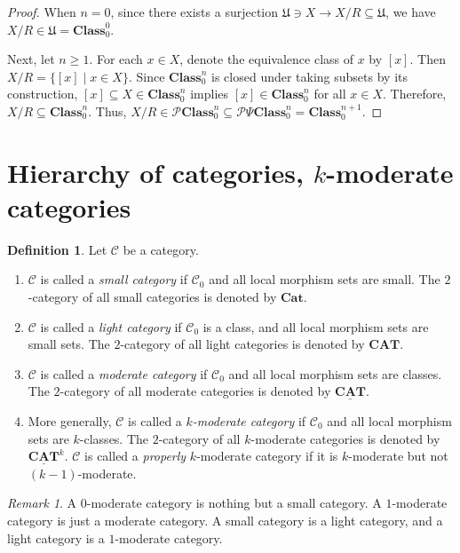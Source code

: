 \documentclass{surv-l}
\numberwithin{equation}{chapter}
\numberwithin{figure}{chapter}
\theoremstyle{plain}
\theoremstyle{definition}
\newtheorem{dfn}[thm]{Definition}
\theoremstyle{remark}
\newtheorem{rmk}[thm]{Remark}
\begin{document}
\begin{proof}
When $n = 0$, since there exists a surjection $\mathfrak{U} \ni X \to X/R \subseteq \mathfrak{U}$,
we have $X/R \in \mathfrak{U} = \mathbf{Class}_0^0$.

Next, let $n \ge 1$.
For each $x \in X$, denote the equivalence class of $x$ by $[x]$.
Then $X/R = \{[x] \mid x \in X\}$.
Since $\mathbf{Class}_0^n$ is closed under taking subsets by its construction,
$[x] \subseteq X \in \mathbf{Class}_0^n$ implies $[x] \in \mathbf{Class}_0^n$ for all $x \in X$.
Therefore, $X/R \subseteq \mathbf{Class}_0^n$.
Thus, $X/R \in \mathcal{P}\mathbf{Class}_0^n \subseteq \mathcal{P}\Psi\mathbf{Class}_0^n = \mathbf{Class}_0^{n+1}$.
\end{proof}

\section{Hierarchy of categories, $k$-moderate categories}\begin{dfn}\label{dfn:small-light-moderate}
Let ${\mathcal{C}}$ be a category.
\begin{enumerate}
\item
${\mathcal{C}}$ is called a \emph{small category}
if
${\mathcal{C}}_0$ and all local morphism sets are small.
The $2$-category of all small categories is denoted by $\mathbf{Cat}$.
\item
${\mathcal{C}}$ is called a \emph{light category}
if
${\mathcal{C}}_0$ is a class, and all local morphism sets are small sets.
The $2$-category of all light categories is denoted by $\mathbf{CAT}$.
\item
${\mathcal{C}}$ is called a \emph{moderate category}
if
${\mathcal{C}}_0$ and all local morphism sets are classes.
The $2$-category of all moderate categories is denoted by $\underline{\mathbf{CAT}}$.
\item
More generally, ${\mathcal{C}}$ is called a \emph{$k$-moderate category}
if
${\mathcal{C}}_0$ and all local morphism sets are $k$-classes.
The $2$-category of all $k$-moderate categories is denoted by $\underline{\mathbf{CAT}}^k$.
${\mathcal{C}}$ is called a \emph{properly} $k$-moderate category
if it is $k$-moderate but not $(k-1)$-moderate.
\end{enumerate}
\end{dfn}

\begin{rmk}
A $0$-moderate category is nothing but a small category.
A $1$-moderate category is just a moderate category.
A small category is a light category, and a light category is a $1$-moderate category.
\end{rmk}
\end{document}
